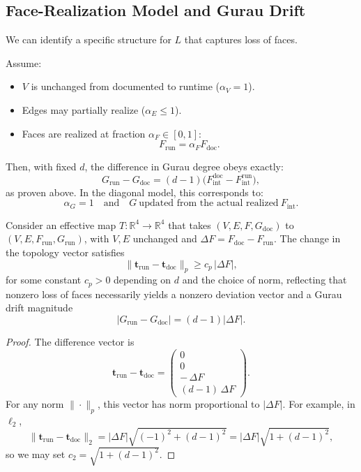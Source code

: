 \documentclass[11pt]{article}
\begin{document}
\subsection{Face-Realization Model and Gurau Drift}

We can identify a specific structure for \(L\) that captures loss of faces.

Assume:
\begin{itemize}
  \item \(V\) is unchanged from documented to runtime (\(\alpha_V = 1\)).
  \item Edges may partially realize (\(\alpha_E \le 1\)).
  \item Faces are realized at fraction \(\alpha_F\in[0,1]\):
  \[
  F_{\mathrm{run}} = \alpha_F F_{\mathrm{doc}}.
  \]
\end{itemize}

Then, with fixed \(d\), the difference in Gurau degree obeys exactly:
\[
G_{\mathrm{run}} - G_{\mathrm{doc}} = (d-1)\big(F_{\mathrm{int}}^{\mathrm{doc}} - F_{\mathrm{int}}^{\mathrm{run}}\big),
\]
as proven above. In the diagonal model, this corresponds to:
\[
\alpha_G = 1 \quad\text{and}\quad G\ \text{updated from the actual realized}\ F_{\mathrm{int}}.
\]

\begin{lemma}
Consider an effective map \(T:\mathbb{R}^4 \to \mathbb{R}^4\) that takes \((V,E,F,G_{\mathrm{doc}})\) to \((V,E,F_{\mathrm{run}},G_{\mathrm{run}})\), with \(V,E\) unchanged and \(\Delta F = F_{\mathrm{doc}} - F_{\mathrm{run}}\). The change in the topology vector satisfies
\[
\big\|\mathbf{t}_{\mathrm{run}} - \mathbf{t}_{\mathrm{doc}}\big\|_p
\ge
c_p\,|\Delta F|,
\]
for some constant \(c_p>0\) depending on \(d\) and the choice of norm, reflecting that nonzero loss of faces necessarily yields a nonzero deviation vector and a Gurau drift magnitude
\[
|G_{\mathrm{run}} - G_{\mathrm{doc}}| = (d-1)|\Delta F|.
\]
\end{lemma}

\begin{proof}
The difference vector is
\[
\mathbf{t}_{\mathrm{run}} - \mathbf{t}_{\mathrm{doc}} =
\begin{pmatrix}
0\\
0\\
-\,\Delta F\\
(d-1)\,\Delta F
\end{pmatrix}.
\]
For any norm \(\|\cdot\|_p\), this vector has norm proportional to \(|\Delta F|\). For example, in \(\ell_2\),
\[
\|\mathbf{t}_{\mathrm{run}} - \mathbf{t}_{\mathrm{doc}}\|_2 =
|\Delta F|\sqrt{(-1)^2 + (d-1)^2} = |\Delta F|\sqrt{1 + (d-1)^2},
\]
so we may set \(c_2 = \sqrt{1 + (d-1)^2}\).
\end{proof}
\end{document}
